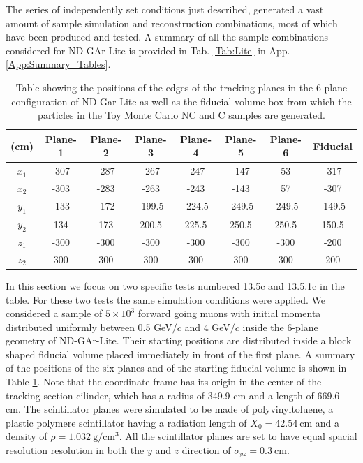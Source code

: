 The series of independently set conditions just described, generated a vast amount of sample simulation and reconstruction combinations, most of which have been produced and tested. A summary of all the sample combinations considered for ND-GAr-Lite is provided in Tab. \ref{Tab:Lite} in App. \ref{App:Summary_Tables}. 
\begin{table}[t]
    \centering
    \begin{tabular}{||c|c|c|c|c|c|c|c||}
        \hline
        (cm) &  Plane-1&  Plane-2&  Plane-3&  Plane-4&  Plane-5&  Plane-6& Fiducial\\
        \hline
        \hline
        $x_1$ & -307 & -287 & -267 & -247 & -147 & 53 & -317\\
        \hline
        $x_2$ & -303 & -283 & -263 & -243 & -143 & 57 & -307\\
        \hline
        $y_1$ & -133 & -172 & -199.5 & -224.5 & -249.5 & -249.5 & -149.5\\
        \hline
        $y_2$ & 134 & 173 & 200.5 & 225.5 & 250.5 & 250.5 & 150.5\\
        \hline
        $z_1$ &  -300&  -300&  -300&  -300&  -300&  -300 & -200\\
        \hline
        $z_2$ &  300&  300&  300&  300&  300&  300 & 200\\
        \hline
    \end{tabular}
    \caption{Table showing the positions of the edges of the tracking planes in the 6-plane configuration of ND-Gar-Lite as well as the fiducial volume box from which the particles in the Toy Monte Carlo NC and C samples are generated. }
    \label{tab:Lite dimentions}
\end{table}

In this section we focus on two specific tests numbered 13.5c and 13.5.1c in the table. For these two tests the same simulation conditions were applied. We considered a sample of $5\times10^3$ forward going muons with initial momenta distributed uniformly between 0.5 GeV$/c$ and 4 GeV$/c$ inside the 6-plane geometry of ND-GAr-Lite. Their starting positions are distributed inside a block shaped fiducial volume placed immediately in front of the first plane. A summary of the positions of the six planes and of the starting fiducial volume is shown in Table \ref{tab:Lite dimentions}. Note that the coordinate frame has its origin in the center of the tracking section cilinder, which has a radius of 349.9 cm and a length of 669.6 cm. The scintillator planes were simulated to be made of polyvinyltoluene, a plastic polymere scintillator having a radiation length of $X_0 = 42.54 \ \text{cm}$ and a density of $\rho = 1.032 \ \text{g}/\text{cm}^3$. All the scintillator planes are set to have equal spacial resolution resolution in both the $y$ and $z$ direction of $\sigma_{yz} = 0.3 \ \text{cm}$. 

